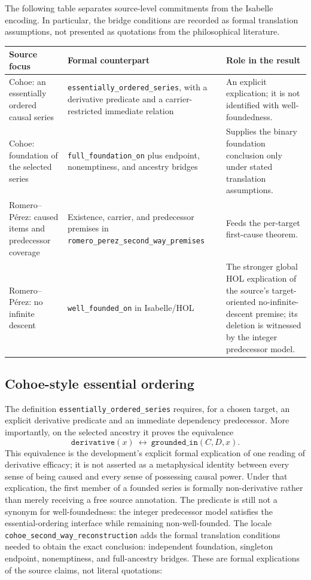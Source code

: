 \documentclass[11pt,a4paper]{article}
\begin{document}
The following table separates source-level commitments from the Isabelle
encoding.  In particular, the bridge conditions are recorded as formal
translation assumptions, not presented as quotations from the philosophical
literature.

\begin{center}
\small
\begin{tabular}{@{}p{.22\linewidth}p{.39\linewidth}p{.29\linewidth}@{}}
\toprule
\textbf{Source focus} & \textbf{Formal counterpart} & \textbf{Role in the result}\\
\midrule
Cohoe: an essentially ordered causal series
  \cite{Cohoe2013} &
\texttt{essentially\_ordered\_series}, with a derivative predicate and a
carrier-restricted immediate relation &
An explicit explication; it is not identified with well-foundedness.\\
Cohoe: foundation of the selected series &
\texttt{full\_foundation\_on} plus endpoint, nonemptiness, and ancestry
bridges &
Supplies the binary foundation conclusion only under stated translation
assumptions.\\
Romero--Pérez: caused items and predecessor coverage
  \cite{RomeroPerez2012} &
Existence, carrier, and predecessor premises in
\texttt{romero\_perez\_second\_way\_premises} &
Feeds the per-target first-cause theorem.\\
Romero--Pérez: no infinite descent &
\texttt{well\_founded\_on} in Isabelle/HOL &
The stronger global HOL explication of the source's target-oriented
no-infinite-descent premise; its deletion is witnessed by the integer
predecessor model.\\
\bottomrule
\end{tabular}
\end{center}

\subsection{Cohoe-style essential ordering}

The definition \texttt{essentially\_ordered\_series} requires, for a chosen
target, an explicit derivative predicate and an immediate dependency
predecessor.  More importantly, on the selected ancestry it proves the
equivalence
\[
\texttt{derivative}(x)\ \longleftrightarrow\
\texttt{grounded\_in}(C,D,x).
\]
This equivalence is the development's explicit formal explication of one
reading of derivative efficacy; it is not asserted as a metaphysical identity
between every sense of being caused and every sense of possessing causal
power.  Under that explication, the first member of a founded series is
formally non-derivative rather than merely receiving a free source annotation.
The predicate is still not a synonym for well-foundedness: the integer
predecessor model satisfies the essential-ordering interface while remaining
non-well-founded.  The locale
\texttt{cohoe\_second\_way\_reconstruction} adds the formal translation
conditions needed to obtain the exact conclusion: independent foundation,
singleton endpoint, nonemptiness, and full-ancestry bridges.  These are formal
explications of the source claims, not literal quotations:
\end{document}
